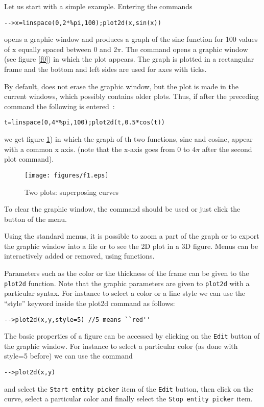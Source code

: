 Let us start with a simple example. Entering the commands 
\begin{verbatim}
-->x=linspace(0,2*%pi,100);plot2d(x,sin(x))
\end{verbatim}
opens a graphic window and produces a graph of the sine function
for 100 values of x equally spaced between 0 and $2 \pi$.
 The   command opens a graphic window
(see figure \ref{f0}) in which the plot appears. 
The graph is plotted in a rectangular frame and the bottom and left
sides are used for axes with ticks.

By default,  does not erase the graphic window, but
the plot is made in the current windows, which possibly contains older
plots. Thus, if after the preceding command the following is entered~:
\begin{verbatim}
t=linspace(0,4*%pi,100);plot2d(t,0.5*cos(t))
\end{verbatim}
\noindent we get figure \ref{g0}) in which the graph of th
two functions, sine and cosine, appear with a common x axis.
(note that the x-axis goes from  $0$ to $4\pi$ after the second
plot command).
\begin{figure}
\begin{center}
\texttt{[image: figures/f1.eps]}
\end{center}
\caption{Two plots: superposing curves}\label{g0}
\end{figure}

To clear the graphic window, the command  should be
used or just click the  button of the   menu.

Using the standard menus, it is possible to zoom a part of the graph or
to export the graphic window into a file or to see the 2D plot in a
3D figure. Menus can be interactively 
added or removed, using    functions.

Parameters such as the color or the thickness of the frame can be
given to the {\tt plot2d} function. Note that the graphic parameters are 
given to {\tt plot2d} with a particular syntax. For instance to select a 
color or a line style we can use the ``style'' keyword inside the plot2d
command as follows:
\begin{verbatim}
-->plot2d(x,y,style=5) //5 means ``red''
\end{verbatim}

The basic properties of a figure can be accessed by clicking on the {\tt Edit}
button of the graphic window. For instance to select a particular color
(as done with style=5 before) we can use the command
\begin{verbatim}
-->plot2d(x,y)
\end{verbatim}
and select the {\tt Start entity picker} item of the {\tt Edit} button, then
click on the curve, select a particular color and finally select the 
{\tt Stop entity picker} item. 

